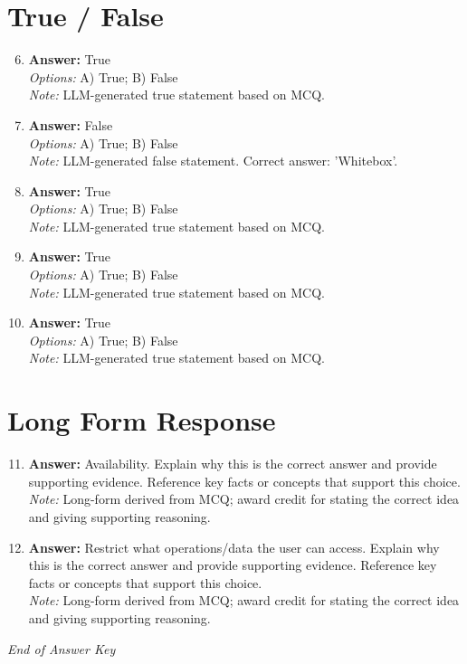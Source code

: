 \documentclass[12pt]{article}
\begin{document}
\section*{True / False}
\begin{enumerate}[label=\arabic*.]
\setcounter{enumi}{5}
\item \textbf{Answer:} True
\\ \textit{Options:} A) True; B) False
\\ \textit{Note:} LLM-generated true statement based on MCQ.
\item \textbf{Answer:} False
\\ \textit{Options:} A) True; B) False
\\ \textit{Note:} LLM-generated false statement. Correct answer: 'Whitebox'.
\item \textbf{Answer:} True
\\ \textit{Options:} A) True; B) False
\\ \textit{Note:} LLM-generated true statement based on MCQ.
\item \textbf{Answer:} True
\\ \textit{Options:} A) True; B) False
\\ \textit{Note:} LLM-generated true statement based on MCQ.
\item \textbf{Answer:} True
\\ \textit{Options:} A) True; B) False
\\ \textit{Note:} LLM-generated true statement based on MCQ.
\end{enumerate}

\section*{Long Form Response}
\begin{enumerate}[label=\arabic*.]
\setcounter{enumi}{10}
\item \textbf{Answer:} Availability. Explain why this is the correct answer and provide supporting evidence. Reference key facts or concepts that support this choice.
\\ \textit{Note:} Long-form derived from MCQ; award credit for stating the correct idea and giving supporting reasoning.
\item \textbf{Answer:} Restrict what operations/data the user can access. Explain why this is the correct answer and provide supporting evidence. Reference key facts or concepts that support this choice.
\\ \textit{Note:} Long-form derived from MCQ; award credit for stating the correct idea and giving supporting reasoning.
\end{enumerate}

\vfill
\noindent\textit{End of Answer Key}
\end{document}
